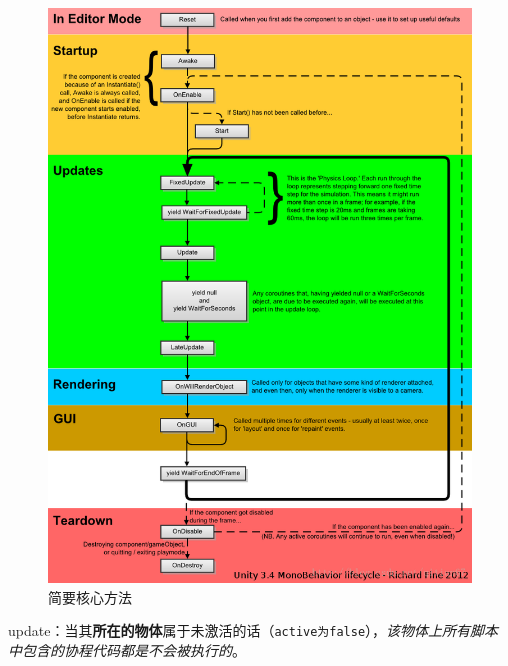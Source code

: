 \documentclass[UTF8,a4paper,12pt]{ctexbook}
\begin{document}
			\clearpage
			\begin{figure}[H]
				\centering
				\includegraphics[scale=0.78]{LifeCicle.png}
				\caption{简要核心方法}
			\end{figure}
		
		update：当其\textbf{所在的物体}属于未激活的话（\verb|active为false|），\textit{该物体上所有脚本中包含的协程代码都是不会被执行的}。
\end{document}
